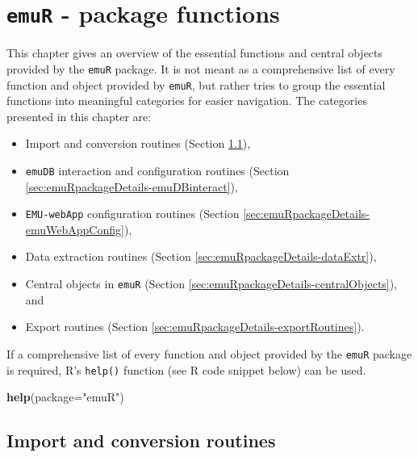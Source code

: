 \documentclass[]{book}
\newenvironment{Shaded}{\begin{snugshade}}{\end{snugshade}}
\newcommand{\DataTypeTok}[1]{\textcolor[rgb]{0.13,0.29,0.53}{#1}}
\newcommand{\KeywordTok}[1]{\textcolor[rgb]{0.13,0.29,0.53}{\textbf{#1}}}
\newcommand{\NormalTok}[1]{#1}
\newcommand{\StringTok}[1]{\textcolor[rgb]{0.31,0.60,0.02}{#1}}
\providecommand{\tightlist}{%
  \setlength{\itemsep}{0pt}\setlength{\parskip}{0pt}}
\theoremstyle{definition}
\theoremstyle{definition}
\theoremstyle{definition}
\theoremstyle{remark}
\begin{document}
\hypertarget{chap:emuRpackageDetails}{%
\chapter{\texorpdfstring{\texttt{emuR} - package
functions}{emuR - package functions}}\label{chap:emuRpackageDetails}}

This chapter gives an overview of the essential functions and central
objects provided by the \texttt{emuR} package. It is not meant as a
comprehensive list of every function and object provided by
\texttt{emuR}, but rather tries to group the essential functions into
meaningful categories for easier navigation. The categories presented in
this chapter are:

\begin{itemize}
\tightlist
\item
  Import and conversion routines (Section
  \ref{sec:emuRpackageDetails-importRoutines}),
\item
  \texttt{emuDB} interaction and configuration routines (Section
  \ref{sec:emuRpackageDetails-emuDBinteract}),
\item
  \texttt{EMU-webApp} configuration routines (Section
  \ref{sec:emuRpackageDetails-emuWebAppConfig}),
\item
  Data extraction routines (Section
  \ref{sec:emuRpackageDetails-dataExtr}),
\item
  Central objects in \texttt{emuR} (Section
  \ref{sec:emuRpackageDetails-centralObjects}), and
\item
  Export routines (Section \ref{sec:emuRpackageDetails-exportRoutines}).
\end{itemize}

If a comprehensive list of every function and object provided by the
\texttt{emuR} package is required, R's \texttt{help()} function (see R
code snippet below) can be used.

\begin{Shaded}
\begin{Highlighting}[]
\KeywordTok{help}\NormalTok{(}\DataTypeTok{package=}\StringTok{"emuR"}\NormalTok{)}
\end{Highlighting}
\end{Shaded}

\hypertarget{sec:emuRpackageDetails-importRoutines}{%
\section{Import and conversion
routines}\label{sec:emuRpackageDetails-importRoutines}}
\end{document}

